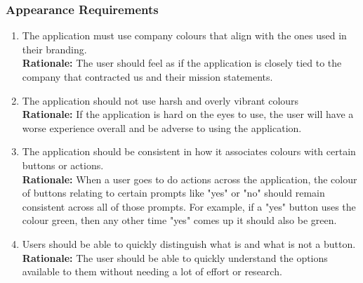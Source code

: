 \documentclass[]{article}
\begin{document}
\subsubsection{Appearance Requirements}
\label{ssub:appearance_requirements}
\begin{enumerate}[{LF-A}1. ]
	\item The application must use company colours that align with the ones used in their branding.\\
	\textbf{Rationale:} The user should feel as if the application is closely tied to the company that contracted us and their mission statements.
	\item The application should not use harsh and overly vibrant colours\\
	\textbf{Rationale:} If the application is hard on the eyes to use, the user will have a worse experience overall and be adverse to using the application.
	\item The application should be consistent in how it associates colours with certain buttons or actions.\\
	\textbf{Rationale:} When a user goes to do actions across the application, the colour of buttons relating to certain prompts like "yes" or "no" should remain consistent across all of those prompts. For example, if a "yes" button uses the colour green, then any other time "yes" comes up it should also be green.
	\item Users should be able to quickly distinguish what is and what is not a button.\\
	\textbf{Rationale:} The user should be able to quickly understand the options available to them without needing a lot of effort or research. 
\end{enumerate}
\end{document}

